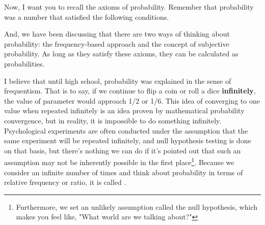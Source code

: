 \documentclass{ltjsbook}
\begin{document}
Now, I want you to recall the axioms of probability. Remember that probability was a number that satisfied the following conditions.

And, we have been discussing that there are two ways of thinking about probability: the frequency-based approach and the concept of subjective probability. As long as they satisfy these axioms, they can be calculated as probabilities.

I believe that until high school, probability was explained in the sense of frequentism. That is to say, if we continue to flip a coin or roll a dice \textbf{infinitely}, the value of parameter would approach 1/2 or 1/6.  This idea of converging to one value when repeated infinitely is an idea proven by mathematical probability convergence, but in reality, it is impossible to do something infinitely. Psychological experiments are often conducted under the assumption that the same experiment will be repeated infinitely, and null hypothesis testing is done on that basis, but there's nothing we can do if it's pointed out that such an assumption may not be inherently possible in the first place\footnote{Furthermore, we set an unlikely assumption called the null hypothesis, which makes you feel like, "What world are we talking about?"}. Because we consider an infinite number of times and think about probability in terms of relative frequency or ratio, it is called .
\end{document}
